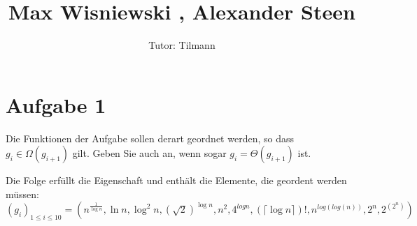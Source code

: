 \documentclass[11pt,a4paper,ngerman]{article}
\author{Tutor: Tilmann}
\date{}
\title{Max Wisniewski , Alexander Steen}
\begin{document}

\maketitle
\thispagestyle{fancy}

\section*{Aufgabe 1}

Die Funktionen der Aufgabe sollen derart geordnet werden, so dass $ g_i \in \Omega (g_{i+1}) $ gilt. Geben Sie auch an, wenn sogar $ g_i = \Theta (g_{i+1}) $ ist. 

\vspace{12px}

Die Folge erfüllt die Eigenschaft und enthält die Elemente, die geordent werden müssen:\\

\centering $(g_i)_{1 \leq i \leq 10} = ( n^{\frac{1}{\log{n}}} , \ln{n} , \log^2{n}  , (\sqrt{2})^{\log{n}}  ,  n^2 ,  4^{log{n}} , (\lceil \log{n} \rceil)! ,   n^{log{(log{(n)})}} ,  2^n  , 2^{(2^n)})$
\end{document}
